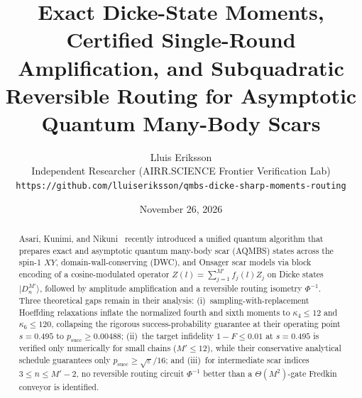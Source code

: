 \documentclass[11pt,a4paper]{article}
\title{\textbf{Exact Dicke-State Moments, Certified Single-Round Amplification, and Subquadratic Reversible Routing for Asymptotic Quantum Many-Body Scars}}
\author{Lluis Eriksson\\[4pt]
\small Independent Researcher (AIRR.SCIENCE Frontier Verification Lab)\\[2pt]
\small \texttt{https://github.com/lluiseriksson/qmbs-dicke-sharp-moments-routing}}
\date{November 26, 2026}
\theoremstyle{remark}
\newcommand{\ket}[1]{\lvert #1 \rangle}
\begin{document}
\maketitle

\begin{abstract}
Asari, Kunimi, and Nikuni~\cite{AKN26} recently introduced a unified quantum algorithm that prepares exact and asymptotic quantum many-body scar (AQMBS) states across the spin-1 $XY$, domain-wall-conserving (DWC), and Onsager scar models via block encoding of a cosine-modulated operator $Z(l) = \sum_{j=1}^{M'} f_j(l) Z_j$ on Dicke states $\ket{D_n^{M'}}$, followed by amplitude amplification and a reversible routing isometry $\Phi^{-1}$. Three theoretical gaps remain in their analysis: (i)~sampling-with-replacement Hoeffding relaxations inflate the normalized fourth and sixth moments to $\kappa_4 \le 12$ and $\kappa_6 \le 120$, collapsing the rigorous success-probability guarantee at their operating point $s = 0.495$ to $p_{\mathrm{succ}} \ge 0.00488$; (ii)~the target infidelity $1 - F \le 0.01$ at $s = 0.495$ is verified only numerically for small chains ($M' \le 12$), while their conservative analytical schedule guarantees only $p_{\mathrm{succ}} \ge \sqrt{\varepsilon}/16$; and (iii)~for intermediate scar indices $3 \le n \le M'-2$, no reversible routing circuit $\Phi^{-1}$ better than a $\Theta(M^2)$-gate Fredkin conveyor is identified.


\end{abstract}
\end{document}
